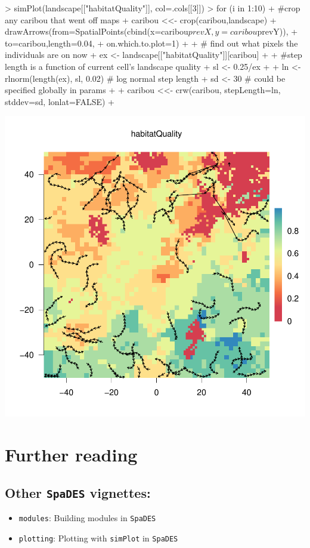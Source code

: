\documentclass{article}
\begin{document}
\begin{Schunk}
\begin{Sinput}
> simPlot(landscape[["habitatQuality"]], col=.cols[[3]])
> for (i in 1:10) {
+   #crop any caribou that went off maps
+   caribou <<- crop(caribou,landscape)
+   drawArrows(from=SpatialPoints(cbind(x=caribou$prevX, y=caribou$prevY)),
+              to=caribou,length=0.04,
+              on.which.to.plot=1)
+ 
+   # find out what pixels the individuals are on now
+   ex <- landscape[["habitatQuality"]][caribou]
+ 
+   #step length is a function of current cell's landscape quality
+   sl <- 0.25/ex
+ 
+   ln <- rlnorm(length(ex), sl, 0.02) # log normal step length
+   sd <- 30 # could be specified globally in params
+ 
+   caribou <<- crw(caribou, stepLength=ln, stddev=sd, lonlat=FALSE)
+ }
\end{Sinput}
\end{Schunk}
\includegraphics{introduction-agent-crw-trajectory}

\newpage

\section{Further reading}

\subsection{Other \texttt{SpaDES} vignettes:}

\begin{itemize}
\item \texttt{modules}: Building modules in \texttt{SpaDES}
\item \texttt{plotting}: Plotting with \texttt{simPlot} in \texttt{SpaDES}
\end{itemize}
\end{document}
